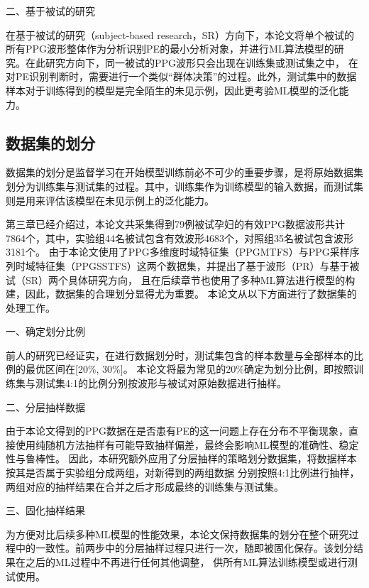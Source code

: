 二、基于被试的研究

在基于被试的研究（subject-based research，SR）方向下，本论文将单个被试的所有PPG波形整体作为分析识别PE的最小分析对象，并进行ML算法模型的研究。在此研究方向下，同一被试的PPG波形只会出现在训练集或测试集之中，
在对PE识别判断时，需要进行一个类似“群体决策”的过程。此外，测试集中的数据样本对于训练得到的模型是完全陌生的未见示例，因此更考验ML模型的泛化能力。

\subsection{数据集的划分}
数据集的划分是监督学习在开始模型训练前必不可少的重要步骤，是将原始数据集划分为训练集与测试集的过程。其中，训练集作为训练模型的输入数据，而测试集则是用来评估该模型在未见示例上的泛化能力。

第三章已经介绍过，本论文共采集得到79例被试孕妇的有效PPG数据波形共计7864个，其中，实验组44名被试包含有效波形4683个，对照组35名被试包含波形3181个。
由于本论文使用了PPG多维度时域特征集（PPGMTFS）与PPG采样序列时域特征集（PPGSSTFS）这两个数据集，并提出了基于波形（PR）与基于被试（SR）两个具体研究方向，
且在后续章节也使用了多种ML算法进行模型的构建，因此，数据集的合理划分显得尤为重要。
本论文从以下方面进行了数据集的处理工作。

一、确定划分比例

前人的研究已经证实，在进行数据划分时，测试集包含的样本数量与全部样本的比例的最优区间在[20\%, 30\%]\cite{Gholamy2018Why7O}。
本论文将最为常见的20\%确定为划分比例，即按照训练集与测试集4:1的比例分别按波形与被试对原始数据进行抽样。

二、分层抽样数据

由于本论文得到的PPG数据在是否患有PE的这一问题上存在分布不平衡现象，直接使用纯随机方法抽样有可能导致抽样偏差，最终会影响ML模型的准确性、稳定性与鲁棒性\cite{Aurélien2018}。
因此，本研究额外应用了分层抽样的策略划分数据集，将数据样本按其是否属于实验组分成两组，对新得到的两组数据
分别按照4:1比例进行抽样，两组对应的抽样结果在合并之后才形成最终的训练集与测试集\cite{Aurélien2018}。

三、固化抽样结果

为方便对比后续多种ML模型的性能效果，本论文保持数据集的划分在整个研究过程中的一致性。前两步中的分层抽样过程只进行一次，随即被固化保存。该划分结果在之后的ML过程中不再进行任何其他调整，
供所有ML算法训练模型或进行测试使用。


